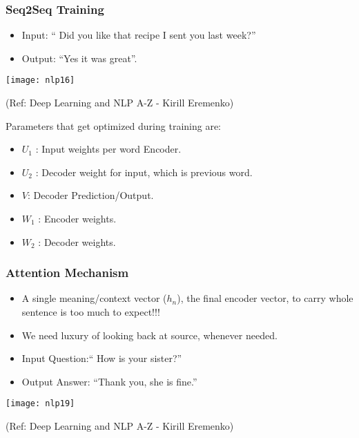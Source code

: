 \begin{frame}[fragile]\frametitle{Seq2Seq Training}

\begin{itemize}
\item Input: `` Did you like that recipe I sent you last week?''
\item Output: ``Yes it was great''.
\end{itemize}

\begin{center}
\texttt{[image: nlp16]}

\tiny{(Ref: Deep Learning and NLP A-Z - Kirill Eremenko)}
\end{center}
Parameters that get optimized during training are:
\begin{itemize}
\item $U_1$ : Input weights per word  Encoder.
\item $U_2$ : Decoder weight for input, which is previous word.
\item $V$: Decoder Prediction/Output.
\item $W_1$ :  Encoder weights.
\item $W_2$ :  Decoder weights.
\end{itemize}


\end{frame}

\begin{frame}[fragile]\frametitle{Attention Mechanism}

\begin{itemize}
\item A single meaning/context vector ($h_n$), the final encoder vector, to carry whole sentence is too much to expect!!!
\item We need luxury of looking back at source, whenever needed.
\item Input Question:`` How is your sister?''
\item Output Answer: ``Thank you, she is fine.''
\end{itemize}
\begin{center}
\texttt{[image: nlp19]}

\tiny{(Ref: Deep Learning and NLP A-Z - Kirill Eremenko)}
\end{center}

\end{frame}

